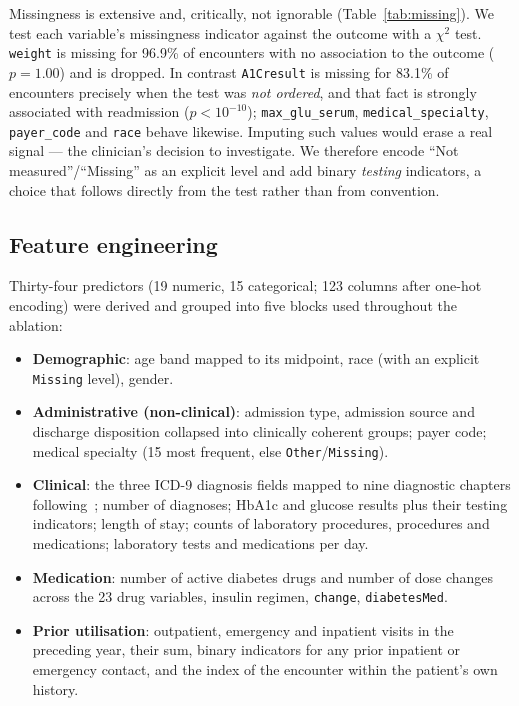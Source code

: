 \documentclass[runningheads]{llncs}
\begin{document}
Missingness is extensive and, critically, not ignorable (Table~\ref{tab:missing}). We
test each variable's missingness indicator against the outcome with a $\chi^2$ test.
\texttt{weight} is missing for 96.9\% of encounters with no association to the outcome
($p=1.00$) and is dropped. In contrast \texttt{A1Cresult} is missing for 83.1\% of
encounters precisely when the test was \emph{not ordered}, and that fact is strongly
associated with readmission ($p<10^{-10}$); \texttt{max\_glu\_serum},
\texttt{medical\_specialty}, \texttt{payer\_code} and \texttt{race} behave likewise.
Imputing such values would erase a real signal --- the clinician's decision to
investigate. We therefore encode ``Not measured''/``Missing'' as an explicit level and
add binary \emph{testing} indicators, a choice that follows directly from the test
rather than from convention.



\subsection{Feature engineering}

Thirty-four predictors (19 numeric, 15 categorical; 123 columns after one-hot
encoding) were derived and grouped into five blocks used throughout the ablation:

\begin{itemize}\setlength\itemsep{1pt}
  \item \textbf{Demographic}: age band mapped to its midpoint, race (with an explicit
    \texttt{Missing} level), gender.
  \item \textbf{Administrative (non-clinical)}: admission type, admission source and
    discharge disposition collapsed into clinically coherent groups; payer code;
    medical specialty (15 most frequent, else \texttt{Other}/\texttt{Missing}).
  \item \textbf{Clinical}: the three ICD-9 diagnosis fields mapped to nine diagnostic
    chapters following~\cite{strack2014}; number of diagnoses; HbA1c and glucose
    results plus their testing indicators; length of stay; counts of laboratory
    procedures, procedures and medications; laboratory tests and medications per day.
  \item \textbf{Medication}: number of active diabetes drugs and number of dose changes
    across the 23 drug variables, insulin regimen, \texttt{change},
    \texttt{diabetesMed}.
  \item \textbf{Prior utilisation}: outpatient, emergency and inpatient visits in the
    preceding year, their sum, binary indicators for any prior inpatient or emergency
    contact, and the index of the encounter within the patient's own history.
\end{itemize}
\end{document}
